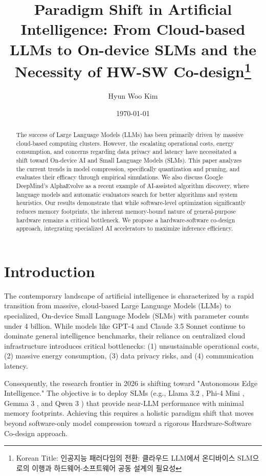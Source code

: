 \documentclass[twocolumn,10pt]{article}
\title{Paradigm Shift in Artificial Intelligence: From Cloud-based LLMs to On-device SLMs and the Necessity of HW-SW Co-design\thanks{Korean Title: 인공지능 패러다임의 전환: 클라우드 LLM에서 온디바이스 SLM으로의 이행과 하드웨어-소프트웨어 공동 설계의 필요성}}
\author{Hyun Woo Kim}
\date{\today}
\begin{document}
\maketitle

\begin{abstract}
The success of Large Language Models (LLMs) has been primarily driven by massive cloud-based computing clusters. However, the escalating operational costs, energy consumption, and concerns regarding data privacy and latency have necessitated a shift toward On-device AI and Small Language Models (SLMs). This paper analyzes the current trends in model compression, specifically quantization and pruning, and evaluates their efficacy through empirical simulations. We also discuss Google DeepMind's AlphaEvolve as a recent example of AI-assisted algorithm discovery, where language models and automatic evaluators search for better algorithms and system heuristics. Our results demonstrate that while software-level optimization significantly reduces memory footprints, the inherent memory-bound nature of general-purpose hardware remains a critical bottleneck. We propose a hardware-software co-design approach, integrating specialized AI accelerators to maximize inference efficiency.
\end{abstract}

\section{Introduction}
The contemporary landscape of artificial intelligence is characterized by a rapid transition from massive, cloud-based Large Language Models (LLMs) to specialized, On-device Small Language Models (SLMs) with parameter counts under 4 billion. While models like GPT-4 and Claude 3.5 Sonnet continue to dominate general intelligence benchmarks, their reliance on centralized cloud infrastructure introduces critical bottlenecks: (1) unsustainable operational costs, (2) massive energy consumption, (3) data privacy risks, and (4) communication latency.

Consequently, the research frontier in 2026 is shifting toward "Autonomous Edge Intelligence." The objective is to deploy SLMs (e.g., Llama 3.2 \cite{llama32_2024}, Phi-4 Mini \cite{phi4_2025}, Gemma 3 \cite{gemma3_2025}, and Qwen 3 \cite{qwen3_2025}) that provide near-LLM performance with minimal memory footprints. Achieving this requires a holistic paradigm shift that moves beyond software-only model compression toward a rigorous Hardware-Software Co-design approach.
\end{document}
